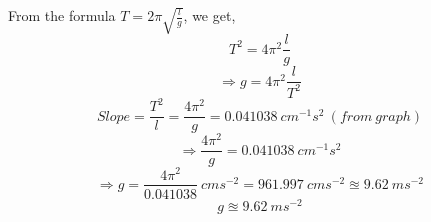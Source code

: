 \documentclass[12pt]{article}
\begin{document}
	From the formula $T = 2\pi \sqrt{\frac{l}{g}}$, we get, $$T^{2} = 4\pi^{2} \frac{l}{g}$$
	$$\Rightarrow g = 4\pi^{2} \frac{l}{T^{2}}$$
	$$Slope = \frac{T^{2}}{l} = \frac{4\pi^{2}}{g} = 0.041038\ cm^{-1} s^{2}\ (from\ graph)$$
	$$\Rightarrow \frac{4\pi^{2}}{g} = 0.041038\ cm^{-1} s^{2}$$
	$$\Rightarrow g = \frac{4\pi^{2}}{ 0.041038}\ cms^{-2} = 961.997\ cms^{-2} \approxeq 9.62\ ms^{-2}$$
	$$\boxed{g \approxeq 9.62\ ms^{-2}}$$
\end{document}
